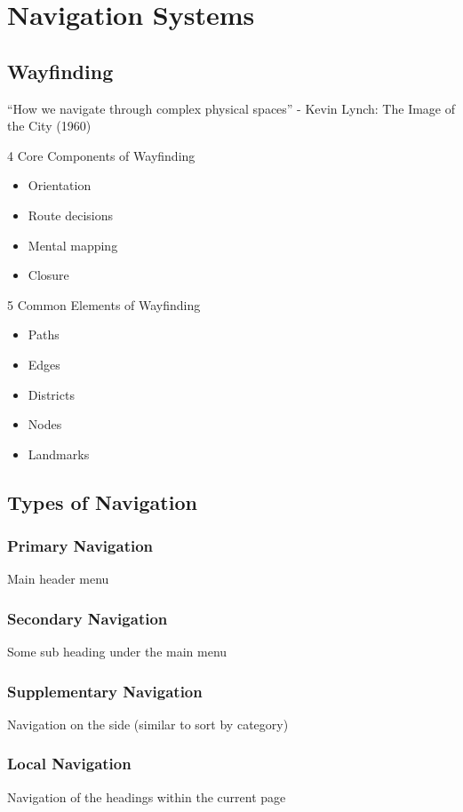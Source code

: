 \section{Navigation Systems}
\subsection{Wayfinding}
\begin{leftbar}
	``How we navigate through complex physical spaces'' - Kevin Lynch: The Image of the City (1960)	
\end{leftbar}
\begin{note}{4 Core Components of Wayfinding}
	\begin{itemize}
		\item Orientation
		\item Route decisions
		\item Mental mapping
		\item Closure	
	\end{itemize}
\end{note}
\begin{note}{5 Common Elements of Wayfinding}
	\begin{itemize}
		\item Paths
		\item Edges
		\item Districts
		\item Nodes
		\item Landmarks
	\end{itemize}
\end{note}

\subsection{Types of Navigation}
\subsubsection{Primary Navigation}
Main header menu
\subsubsection{Secondary Navigation}
Some sub heading under the main menu
\subsubsection{Supplementary Navigation}
Navigation on the side (similar to sort by category)
\subsubsection{Local Navigation}
Navigation of the headings within the current page
